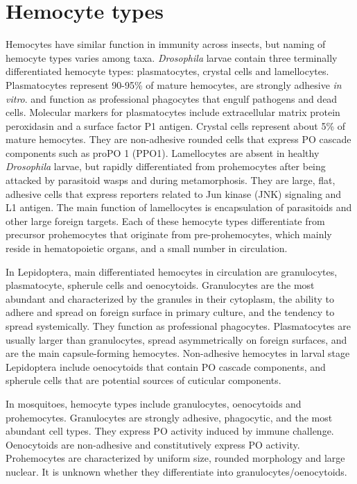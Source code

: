 \documentclass[11pt]{article}
\begin{document}
\section{Hemocyte types}
Hemocytes have similar function in immunity across insects, but naming of hemocyte types varies among taxa. 
\textit{Drosophila} larvae contain three terminally differentiated hemocyte types: plasmatocytes, crystal cells and lamellocytes. 
Plasmatocytes represent 90-95\% of mature hemocytes, are strongly adhesive \textit{in vitro}. and function as professional phagocytes that engulf pathogens and dead cells. 
Molecular markers for plasmatocytes include extracellular matrix protein peroxidasin and a surface factor P1 antigen. 
Crystal cells represent about 5\% of mature hemocytes. 
They are non-adhesive rounded cells that express PO cascade components such as proPO 1 (PPO1). 
Lamellocytes are absent in healthy \textit{Drosophila} larvae, but rapidly differentiated from prohemocytes after being attacked by parasitoid wasps and during metamorphosis. 
They are large, flat, adhesive cells that express reporters related to Jun kinase (JNK) signaling and L1 antigen. 
The main function of lamellocytes is encapsulation of parasitoids and other large foreign targets. 
Each of these hemocyte types differentiate from precursor prohemocytes that originate from pre-prohemocytes, which mainly reside in hematopoietic organs, and a small number in circulation.

\newline

In Lepidoptera, main differentiated hemocytes in circulation are granulocytes, plasmatocyte, spherule cells and oenocytoids. 
Granulocytes are the most abundant and characterized by the granules in their cytoplasm, the ability to adhere and spread on foreign surface in primary culture, and the tendency to spread systemically. 
They function as professional phagocytes. 
Plasmatocytes are usually larger than granulocytes, spread asymmetrically on foreign surfaces, and are the main capsule-forming hemocytes. 
Non-adhesive hemocytes in larval stage Lepidoptera include oenocytoids that contain PO cascade components, and spherule cells that are potential sources of cuticular components. 

\newline

In mosquitoes, hemocyte types include granulocytes, oenocytoids and prohemocytes. 
Granulocytes are strongly adhesive, phagocytic, and the most abundant cell types. 
They express PO activity induced by immune challenge. 
Oenocytoids are non-adhesive and constitutively express PO activity. 
Prohemocytes are characterized by uniform size, rounded morphology and large nuclear. 
It is unknown whether they differentiate into granulocytes/oenocytoids.
\end{document}
